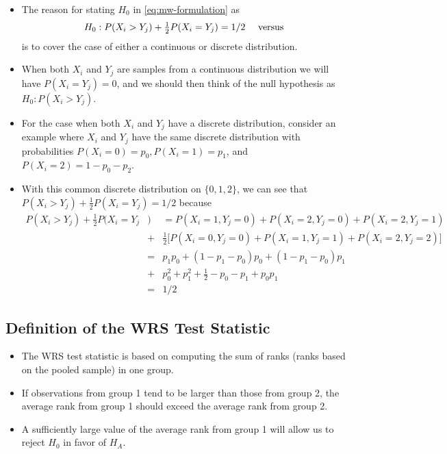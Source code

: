 \documentclass[]{book}
\begin{document}
\begin{itemize}
\item
  The reason for stating \(H_{0}\) in \eqref{eq:mw-formulation} as
  \begin{equation}
  H_{0}: P(X_{i} > Y_{j}) + \tfrac{1}{2}P(X_{i} = Y_{j}) = 1/2 \quad \textrm{ versus } \\
  \end{equation}
  is to cover the case of either a continuous or discrete distribution.
\item
  When both \(X_{i}\) and \(Y_{j}\) are samples from a continuous distribution
  we will have \(P(X_{i} = Y_{j}) = 0\), and we should then think of the null
  hypothesis as \(H_{0}: P(X_{i} > Y_{j})\).
\item
  For the case when both \(X_{i}\) and \(Y_{j}\) have a discrete distribution,
  consider an example where \(X_{i}\) and \(Y_{j}\) have the same discrete
  distribution with probabilities \(P(X_{i} = 0) = p_{0}, P(X_{i} = 1) = p_{1}\),
  and \(P(X_{i} = 2) = 1 - p_{0} - p_{2}\).
\item
  With this common discrete distribution on \(\{0, 1, 2\}\), we can see
  that \(P(X_{i} > Y_{j}) + \tfrac{1}{2}P(X_{i} = Y_{j}) = 1/2\) because
  \begin{eqnarray}
  P(X_{i} > Y_{j}) + \frac{1}{2}P(X_{i} = Y_{j}&)& = P(X_{i}=1, Y_{j}=0) + P(X_{i} = 2, Y_{j}=0) + P(X_{i}=2, Y_{j}=1)  \nonumber \\
  &+& \frac{1}{2}\Big[P(X_{i}=0, Y_{j}=0) + P(X_{i} = 1, Y_{j}=1) + P(X_{i}=2, Y_{j}=2) \Big] \nonumber \\
  &=& p_{1}p_{0} + (1 - p_{1} - p_{0})p_{0} + (1 - p_{1} - p_{0})p_{1}  \nonumber \\
  &+&  p_{0}^{2} + p_{1}^{2} + \frac{1}{2} - p_{0} - p_{1} + p_{0}p_{1} \nonumber \\
  &=& 1/2 \nonumber
  \end{eqnarray}
\end{itemize}

\hypertarget{definition-of-the-wrs-test-statistic}{%
\subsection{Definition of the WRS Test Statistic}\label{definition-of-the-wrs-test-statistic}}

\begin{itemize}
\item
  The WRS test statistic is based on computing the sum of ranks (ranks based on the pooled sample)
  in one group.
\item
  If observations from group 1 tend to be larger than those from group 2, the average rank from group 1 should exceed the
  average rank from group 2.
\item
  A sufficiently large value of the average rank from group 1 will allow us to reject \(H_{0}\)
  in favor of \(H_{A}\).
\end{itemize}
\end{document}
